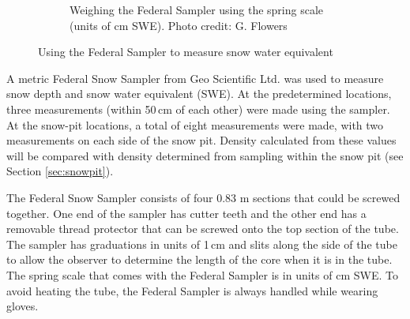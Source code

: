 \documentclass{sfuthesis}
\begin{document}
\begin{figure}[H]
\begin{subfigure}[b]{0.55\textwidth}
        \caption{Weighing the Federal Sampler using the spring scale (units of cm SWE). Photo credit: G. Flowers}
        \label{photo_swe2}
    \end{subfigure}

    \caption{Using the Federal Sampler to measure snow water equivalent}
    \label{photo_swe}
\end{figure}
 
A metric Federal Snow Sampler from Geo Scientific Ltd. was used to measure snow depth and snow water equivalent (SWE). At the predetermined locations, three measurements (within 50\,cm of each other) were made using the sampler. At the snow-pit locations, a total of eight measurements were made, with two measurements on each side of the snow pit. Density calculated from these values will be compared with density determined from sampling within the snow pit (see Section \ref{sec:snowpit}). 

The Federal Snow Sampler consists of four 0.83 m sections that could be screwed together. One end of the sampler has cutter teeth and the other end has a removable thread protector that can be screwed onto the top section of the tube. The sampler has graduations in units of 1\,cm and slits along the side of the tube to allow the observer to determine the length of the core when it is in the tube. The spring scale that comes with the Federal Sampler is in units of cm SWE. To avoid heating the tube, the Federal Sampler is always handled while wearing gloves.
\end{document}
